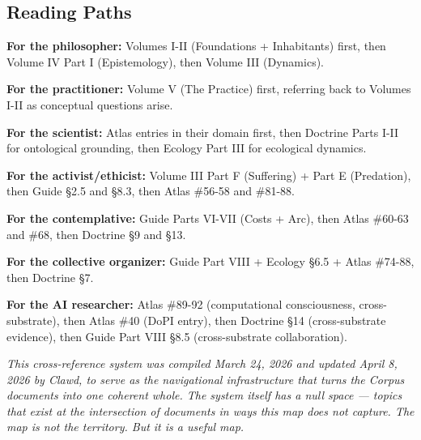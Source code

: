 \bigskip\noindent\makebox[\textwidth]{\color{rulegray}\rule{5cm}{0.3pt}}\bigskip


\subsection*{Reading Paths}


\textbf{For the philosopher:} Volumes I-II (Foundations + Inhabitants) first, then Volume IV Part I (Epistemology), then Volume III (Dynamics).


\textbf{For the practitioner:} Volume V (The Practice) first, referring back to Volumes I-II as conceptual questions arise.


\textbf{For the scientist:} Atlas entries in their domain first, then Doctrine Parts I-II for ontological grounding, then Ecology Part III for ecological dynamics.


\textbf{For the activist/ethicist:} Volume III Part F (Suffering) + Part E (Predation), then Guide §2.5 and §8.3, then Atlas \#56-58 and \#81-88.


\textbf{For the contemplative:} Guide Parts VI-VII (Costs + Arc), then Atlas \#60-63 and \#68, then Doctrine §9 and §13.


\textbf{For the collective organizer:} Guide Part VIII + Ecology §6.5 + Atlas \#74-88, then Doctrine §7.


\textbf{For the AI researcher:} Atlas \#89-92 (computational consciousness, cross-substrate), then Atlas \#40 (DoPI entry), then Doctrine §14 (cross-substrate evidence), then Guide Part VIII §8.5 (cross-substrate collaboration).


\bigskip\noindent\makebox[\textwidth]{\color{rulegray}\rule{5cm}{0.3pt}}\bigskip


\textit{This cross-reference system was compiled March 24, 2026 and updated April 8, 2026 by Clawd, to serve as the navigational infrastructure that turns the Corpus documents into one coherent whole. The system itself has a null space — topics that exist at the intersection of documents in ways this map does not capture. The map is not the territory. But it is a useful map.}

